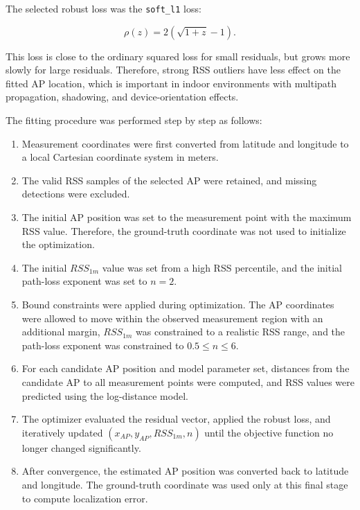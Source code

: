 \documentclass[11pt,a4paper]{article}
\begin{document}
The selected robust loss was the \texttt{soft\_l1} loss:

\begin{equation}
\rho(z)=2\left(\sqrt{1+z}-1\right).
\end{equation}

This loss is close to the ordinary squared loss for small residuals, but grows
more slowly for large residuals. Therefore, strong RSS outliers have less effect
on the fitted AP location, which is important in indoor environments with
multipath propagation, shadowing, and device-orientation effects.

The fitting procedure was performed step by step as follows:

\begin{enumerate}
\item Measurement coordinates were first converted from latitude and longitude
to a local Cartesian coordinate system in meters.

\item The valid RSS samples of the selected AP were retained, and missing
detections were excluded.

\item The initial AP position was set to the measurement point with the maximum
RSS value. Therefore, the ground-truth coordinate was not used to initialize the
optimization.

\item The initial \(RSS_{1m}\) value was set from a high RSS percentile, and the
initial path-loss exponent was set to \(n=2\).

\item Bound constraints were applied during optimization. The AP coordinates
were allowed to move within the observed measurement region with an additional
margin, \(RSS_{1m}\) was constrained to a realistic RSS range, and the path-loss
exponent was constrained to \(0.5 \le n \le 6\).

\item For each candidate AP position and model parameter set, distances from the
candidate AP to all measurement points were computed, and RSS values were
predicted using the log-distance model.

\item The optimizer evaluated the residual vector, applied the robust loss, and
iteratively updated \((x_{AP},y_{AP},RSS_{1m},n)\) until the objective function
no longer changed significantly.

\item After convergence, the estimated AP position was converted back to
latitude and longitude. The ground-truth coordinate was used only at this final
stage to compute localization error.
\end{enumerate}
\end{document}
